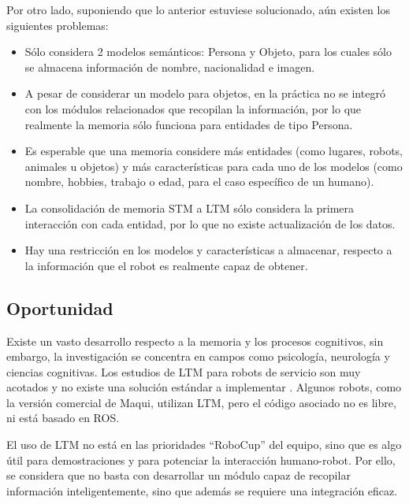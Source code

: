 Por otro lado, suponiendo que lo anterior estuviese solucionado, aún existen los siguientes problemas:
\begin{itemize}
	\item Sólo considera 2 modelos semánticos: Persona y Objeto, para los cuales sólo se almacena información de nombre, nacionalidad e imagen.
	\item A pesar de considerar un modelo para objetos, en la práctica no se integró con los módulos relacionados que recopilan la información, por lo que realmente la memoria sólo funciona para entidades de tipo Persona.
	\item Es esperable que una memoria considere más entidades (como lugares, robots, animales u objetos) y más características para cada uno de los modelos (como nombre, hobbies, trabajo o edad, para el caso específico de un humano).
	\item La consolidación de memoria STM a LTM sólo considera la primera interacción con cada entidad, por lo que no existe actualización de los datos.
	\item Hay una restricción en los modelos y características a almacenar, respecto a la información que el robot es realmente capaz de obtener.
\end{itemize}

\subsection{Oportunidad}

Existe un vasto desarrollo respecto a la memoria y los procesos cognitivos, sin embargo, la investigación se concentra en campos como psicología, neurología y ciencias cognitivas. Los estudios de LTM para robots de servicio son muy acotados y no existe una solución estándar a implementar \cite{ltm_in_robocup}. Algunos robots, como la versión comercial de Maqui, utilizan LTM, pero el código asociado no es libre, ni está basado en ROS.

El uso de LTM no está en las prioridades ``RoboCup'' del equipo, sino que es algo útil para demostraciones y para potenciar la interacción humano-robot. Por ello, se considera que no basta con desarrollar un módulo capaz de recopilar información inteligentemente, sino que además se requiere una integración eficaz.

